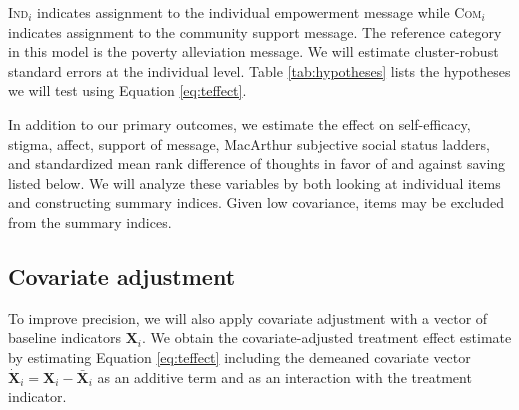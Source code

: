 \documentclass[11pt, a4paper]{article}\usepackage[]{graphicx}\usepackage[]{color}
\begin{document}
        \textsc{Ind}$_{i}$ indicates assignment to the individual empowerment message while \textsc{Com}$_{i}$ indicates assignment to the community support message. The reference category in this model is the poverty alleviation message. We will estimate cluster-robust standard errors at the individual level. Table \ref{tab:hypotheses} lists the hypotheses we will test using Equation \ref{eq:teffect}. 

        
        \begin{table}[h]
        \centering
        \caption{Primary hypothesis tests}
        \label{tab:hypotheses}
        \end{table} 
        
In addition to our primary outcomes, we estimate the effect on self-efficacy, stigma, affect, support of message, MacArthur subjective social status ladders, and standardized mean rank difference of thoughts in favor of and against saving listed below. We will analyze these variables by both looking at individual items and constructing summary indices. Given low covariance, items may be excluded from the summary indices. 

      \subsection{Covariate adjustment}

        To improve precision, we will also apply covariate adjustment with a vector of baseline indicators $\mathbf{X}_i$. We obtain the covariate-adjusted treatment effect estimate by estimating Equation \ref{eq:teffect} including the demeaned covariate vector $\mathbf{\dot X}_{i} = \mathbf{X}_{i} - \mathbf{\bar X}_{i}$ as an additive term and as an interaction with the treatment indicator.
\end{document}
